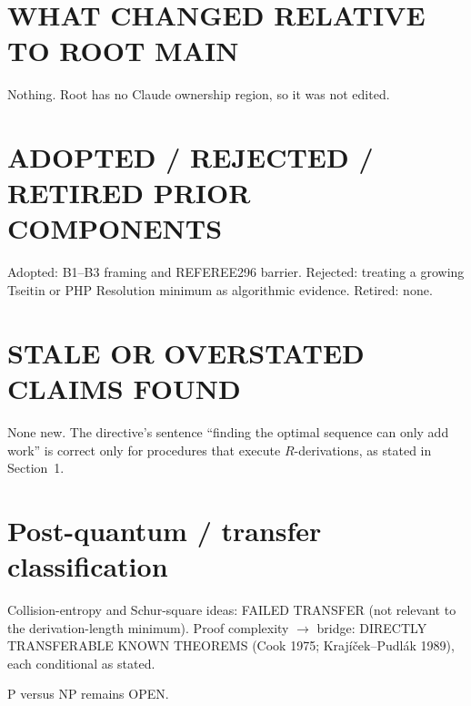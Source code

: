 \documentclass[11pt]{article}
\begin{document}
\section*{WHAT CHANGED RELATIVE TO ROOT MAIN}
Nothing. Root  has no Claude ownership region, so it was not edited.
\section*{ADOPTED / REJECTED / RETIRED PRIOR COMPONENTS}
Adopted: B1--B3 framing and REFEREE296 barrier. Rejected: treating a growing Tseitin or PHP
Resolution minimum as algorithmic evidence. Retired: none.
\section*{STALE OR OVERSTATED CLAIMS FOUND}
None new. The directive's sentence ``finding the optimal sequence can only add work''
is correct only for procedures that execute $R$-derivations, as stated in Section~1.
\section*{Post-quantum / transfer classification}
Collision-entropy and Schur-square ideas: FAILED TRANSFER (not relevant to the
derivation-length minimum). Proof complexity $\to$ bridge: DIRECTLY TRANSFERABLE
KNOWN THEOREMS (Cook 1975; Krajíček--Pudlák 1989), each conditional as stated.

\medskip\noindent P versus NP remains OPEN.
\end{document}
